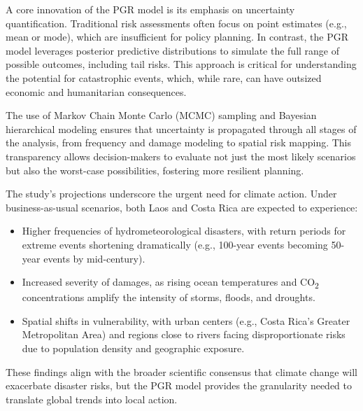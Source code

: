 A core innovation of the PGR model is its emphasis on uncertainty quantification. Traditional risk assessments often focus on point estimates (e.g., mean or mode), which are insufficient for policy planning. In contrast, the PGR model leverages posterior predictive distributions to simulate the full range of possible outcomes, including tail risks. This approach is critical for understanding the potential for catastrophic events, which, while rare, can have outsized economic and humanitarian consequences.

The use of Markov Chain Monte Carlo (MCMC) sampling and Bayesian hierarchical modeling ensures that uncertainty is propagated through all stages of the analysis, from frequency and damage modeling to spatial risk mapping. This transparency allows decision-makers to evaluate not just the most likely scenarios but also the worst-case possibilities, fostering more resilient planning.

The study's projections underscore the urgent need for climate action. Under business-as-usual scenarios, both Laos and Costa Rica are expected to experience:

\begin{itemize}
    \item Higher frequencies of hydrometeorological disasters, with return periods for extreme events shortening dramatically (e.g., 100-year events becoming 50-year events by mid-century).

    \item Increased severity of damages, as rising ocean temperatures and CO\textsubscript{2} concentrations amplify the intensity of storms, floods, and droughts.

    \item Spatial shifts in vulnerability, with urban centers (e.g., Costa Rica's Greater Metropolitan Area) and regions close to rivers facing disproportionate risks due to population density and geographic exposure.
\end{itemize}

These findings align with the broader scientific consensus that climate change will exacerbate disaster risks, but the PGR model provides the granularity needed to translate global trends into local action.
